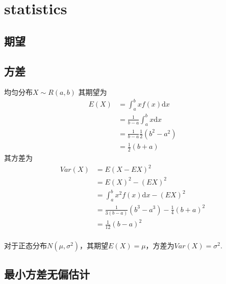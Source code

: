 \chapter{statistics}

\section{期望}
\section{方差}
均匀分布$X \sim R(a, b)$
其期望为
\begin{equation}
    \begin{split}
        E(X) &= \int_{a}^{b}x f(x) \mathrm{d}x		\\
        &= \frac{1}{b-a}\int_{a}^{b}x\mathrm{d}x	\\
        &= \frac{1}{b-a} \frac{1}{2} (b^2 - a^2)	\\
        &= \frac{1}{2}(b + a)
    \end{split}
\end{equation}
其方差为
\begin{equation}
    \begin{split}
        Var(X) &= E(X - EX)^2  \\
        &= E(X)^2 - (EX)^2 \\
        &= \int_{a}^{b} x^2 f(x) \mathrm{d}x - (EX)^2 \\
        &= \frac{1}{3(b-a)} (b^3 - a^3) - \frac{1}{4}(b+a)^2 \\
        &= \frac{1}{12}(b-a)^2
    \end{split}
\end{equation}
\\
对于正态分布$N(\mu, \sigma ^2)$，其期望$E(X) = \mu$，方差为$Var(X) = \sigma^2$.


\section{最小方差无偏估计}
